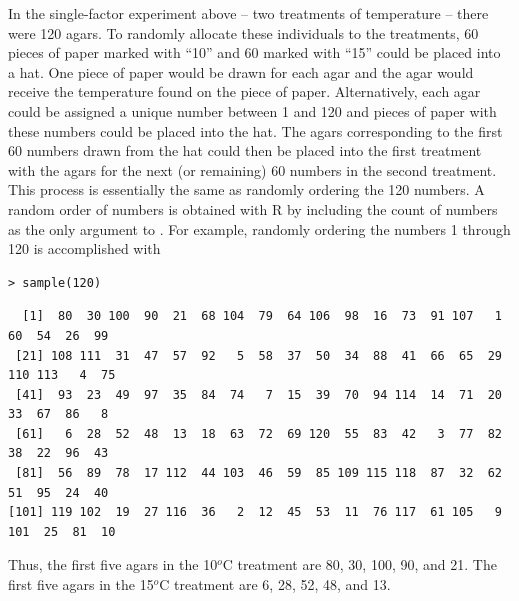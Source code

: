 \documentclass[10pt,openany]{book}\usepackage[]{graphicx}\usepackage[]{color}
\makeatletter
\newenvironment{kframe}{%
 \def\at@end@of@kframe{}%
 \ifinner\ifhmode%
  \def\at@end@of@kframe{\end{minipage}}%
  \begin{minipage}{\columnwidth}%
 \fi\fi%
 \def\FrameCommand##1{\hskip\@totalleftmargin \hskip-\fboxsep
 \colorbox{shadecolor}{##1}\hskip-\fboxsep
     \hskip-\linewidth \hskip-\@totalleftmargin \hskip\columnwidth}%
 \MakeFramed {\advance\hsize-\width
   \@totalleftmargin\z@ \linewidth\hsize
   \@setminipage}}%
 {\par\unskip\endMakeFramed%
 \at@end@of@kframe}
\newenvironment{knitrout}{}{} %
\makeatother
\begin{document}
In the single-factor experiment above -- two treatments of temperature -- there were 120 agars.  To randomly allocate these individuals to the treatments, 60 pieces of paper marked with ``10'' and 60 marked with ``15'' could be placed into a hat.  One piece of paper would be drawn for each agar and the agar would receive the temperature found on the piece of paper.  Alternatively, each agar could be assigned a unique number between 1 and 120 and pieces of paper with these numbers could be placed into the hat.  The agars corresponding to the first 60 numbers drawn from the hat could then be placed into the first treatment with the agars for the next (or remaining) 60 numbers in the second treatment.  This process is essentially the same as randomly ordering the 120 numbers.  A random order of numbers is obtained with R by including the count of numbers as the only argument to .  For example, randomly ordering the numbers 1 through 120 is accomplished with

\begin{knitrout}
\color{fgcolor}\begin{kframe}
\begin{verbatim}
> sample(120)
\end{verbatim}
\end{kframe}
\end{knitrout}
\vspace{-12pt}
\begin{knitrout}
\color{fgcolor}\begin{kframe}
\begin{verbatim}
  [1]  80  30 100  90  21  68 104  79  64 106  98  16  73  91 107   1  60  54  26  99
 [21] 108 111  31  47  57  92   5  58  37  50  34  88  41  66  65  29 110 113   4  75
 [41]  93  23  49  97  35  84  74   7  15  39  70  94 114  14  71  20  33  67  86   8
 [61]   6  28  52  48  13  18  63  72  69 120  55  83  42   3  77  82  38  22  96  43
 [81]  56  89  78  17 112  44 103  46  59  85 109 115 118  87  32  62  51  95  24  40
[101] 119 102  19  27 116  36   2  12  45  53  11  76 117  61 105   9 101  25  81  10
\end{verbatim}
\end{kframe}
\end{knitrout}

Thus, the first five agars in the 10$^{o}$C treatment are 80, 30, 100, 90, and 21.  The first five agars in the 15$^{o}$C treatment are 6, 28, 52, 48, and 13.
\end{document}
